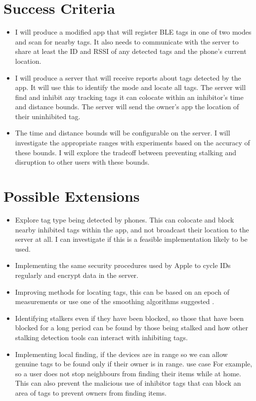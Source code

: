 \documentclass{article}
\begin{document}
\section{Success Criteria}
\begin{itemize}
\item{I will produce a modified app that will register BLE tags in one of two modes and scan for nearby tags. It also needs to communicate with the server to share at least the ID and RSSI of any detected tags and the phone's current location.}


\item{I will produce a server that will receive reports about tags detected by the app. It will use this to identify the mode and locate all tags. The server will find and inhibit any tracking tags it can colocate within an inhibitor's time and distance bounds. The server will send the owner's app the location of their uninhibited tag. }


\item{The time and distance bounds will be configurable on the server. I will investigate the appropriate ranges with experiments based on the accuracy of these bounds. I will explore the tradeoff between preventing stalking and disruption to other users with these bounds.}


\end{itemize}
\section{Possible Extensions}
\begin{itemize}


\item{Explore tag type being detected by phones. This can colocate and block nearby inhibited tags within the app, and not broadcast their location to the server at all.  I can investigate if this is a feasible implementation likely to be used.}


\item{Implementing the same security procedures used by Apple to cycle IDs regularly and encrypt data in the server.
}


\item{Improving methods for locating tags, this can be based on an epoch of measurements\cite{FingerprintingBLE} or use one of the smoothing algorithms suggested \cite{Smooth}. }


\item{Identifying stalkers even if they have been blocked, so those that have been blocked for a long period can be found by those being stalked and how other stalking detection tools can interact with inhibiting tags.}


\item{Implementing local finding, if the devices are in range so we can allow genuine tags to be found only if their owner is in range. use case For example, so a user does not stop neighbours from finding their items while at home. This can also prevent the malicious use of inhibitor tags that can block an area of tags to prevent owners from finding items.}
\end{itemize}
\end{document}
